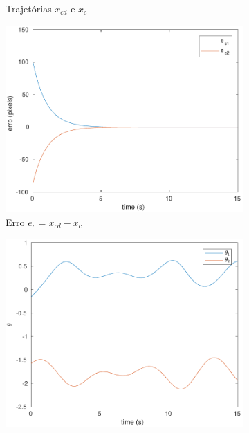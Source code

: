\documentclass[a4paper,11pt]{article}
\theoremstyle{mytheor}
\begin{document}
\begin{figure}[ht]
\begin{minipage}{\linewidth}
\begin{subfigure}[b]{0.49\textwidth}
    \caption{Trajetórias $x_{cd}$ e $x_c$}
    \label{fig:ex3_1_x_c}
    \end{subfigure}
    \begin{subfigure}[b]{0.49\textwidth}
    \includegraphics[width=1\textwidth]{figs/ex3_1_e_c.pdf}
    \caption{Erro $e_{c} = x_{cd} - x_c$}
    \label{fig:ex3_1_e_c}
    \end{subfigure}
  \end{minipage}
  \begin{minipage}{\linewidth}
  \centering
    \begin{subfigure}[b]{0.49\textwidth}
    \includegraphics[width=1\textwidth]{figs/ex3_1_q.pdf}

\end{subfigure}
\end{minipage}
\end{figure}
\end{document}
